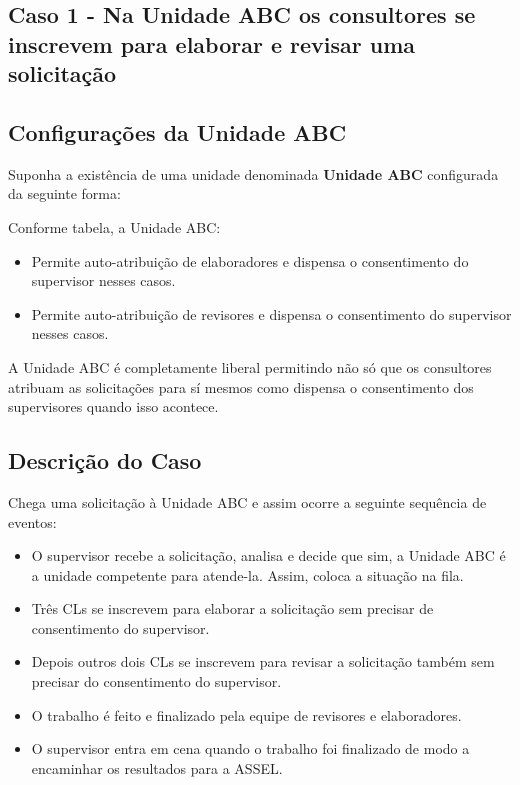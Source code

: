 \begin{landscape}
\section{Caso 1 - Na Unidade ABC os consultores se inscrevem para elaborar e revisar uma solicitação}

\subsection*{Configurações da Unidade ABC}

Suponha a existência de uma unidade denominada \textbf{Unidade ABC} configurada da seguinte forma: 


Conforme tabela, a Unidade ABC:
\begin{itemize}
	\item Permite auto-atribuição de elaboradores e dispensa o consentimento do supervisor nesses casos.
	\item Permite auto-atribuição de revisores e dispensa o consentimento do supervisor nesses casos.
\end{itemize}

A Unidade ABC é completamente liberal permitindo não só que os consultores atribuam as solicitações para sí mesmos como dispensa o consentimento dos supervisores quando isso acontece.

\subsection*{Descrição do Caso}

Chega uma solicitação \SOLD à Unidade ABC e assim ocorre a seguinte sequência de eventos:
\begin{itemize}
	\item O supervisor recebe a solicitação, analisa e decide que sim, a Unidade ABC é a unidade competente para atende-la. Assim, coloca a situação na fila.
	\item Três CLs se inscrevem para elaborar a solicitação \SOLD sem precisar de consentimento do supervisor.
	\item Depois outros dois CLs se inscrevem para revisar a solicitação também sem precisar do consentimento do supervisor. 
	\item O trabalho é feito e finalizado pela equipe de revisores e elaboradores.
	\item O supervisor entra em cena quando o trabalho foi finalizado de modo a encaminhar os resultados para a ASSEL.
\end{itemize}


\end{landscape}
